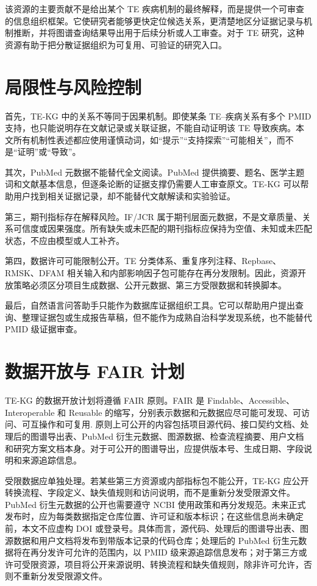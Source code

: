 \documentclass[12pt,a4paper,UTF8]{ctexart}
\begin{document}
该资源的主要贡献不是给出某个 TE 疾病机制的最终解释，而是提供一个可审查的信息组织框架。它使研究者能够更快定位候选关系，更清楚地区分证据记录与机制推断，并将图谱查询结果导出用于后续分析或人工审查。对于 TE 研究，这种资源有助于把分散证据组织为可复用、可验证的研究入口。

\section{局限性与风险控制}

首先，TE-KG 中的关系不等同于因果机制。即使某条 TE--疾病关系有多个 PMID 支持，也只能说明存在文献记录或关联证据，不能自动证明该 TE 导致疾病。本文所有机制性表述都应使用谨慎动词，如“提示”“支持探索”“可能相关”，而不是“证明”或“导致”。

其次，PubMed 元数据不能替代全文阅读。PubMed 提供摘要、题名、医学主题词和文献基本信息，但逐条论断的证据支撑仍需要人工审查原文。TE-KG 可以帮助用户找到相关证据记录，却不能替代文献解读和实验验证。

第三，期刊指标存在解释风险。IF/JCR 属于期刊层面元数据，不是文章质量、关系可信度或因果强度。所有缺失或未匹配的期刊指标应保持为空值、未知或未匹配状态，不应由模型或人工补齐。

第四，数据许可可能限制公开。TE 分类体系、重复序列注释、Repbase、RMSK、DFAM 相关输入和内部影响因子包可能存在再分发限制。因此，资源开放策略必须区分项目生成数据、公开元数据、第三方受限数据和转换脚本。

最后，自然语言问答助手只能作为数据库证据组织工具。它可以帮助用户提出查询、整理证据包或生成报告草稿，但不能作为成熟自治科学发现系统，也不能替代 PMID 级证据审查。

\section{数据开放与 FAIR 计划}

TE-KG 的数据开放计划将遵循 FAIR 原则。FAIR 是 Findable、Accessible、Interoperable 和 Reusable 的缩写，分别表示数据和元数据应尽可能可发现、可访问、可互操作和可复用\cite{wilkinson2016fair}. 原则上可公开的内容包括项目源代码、接口契约文档、处理后的图谱导出表、PubMed 衍生元数据、图源数据、检查流程摘要、用户文档和研究方案文档本身。对于可公开的图谱导出，应提供版本号、生成日期、字段说明和来源追踪信息。

受限数据应单独处理。若某些第三方资源或内部指标包不能公开，TE-KG 应公开转换流程、字段定义、缺失值规则和访问说明，而不是重新分发受限源文件。PubMed 衍生元数据的公开也需要遵守 NCBI 使用政策和再分发规范。未来正式发布时，应为每类数据指定仓库位置、许可证和版本标识；在这些信息尚未确定前，本文不应虚构 DOI 或登录号。具体而言，源代码、处理后的图谱导出表、图源数据和用户文档将发布到带版本记录的代码仓库；处理后的 PubMed 衍生元数据将在再分发许可允许的范围内，以 PMID 级来源追踪信息发布；对于第三方或许可受限资源，项目将公开来源说明、转换流程和缺失值规则，除非许可允许，否则不重新分发受限源文件。
\end{document}
